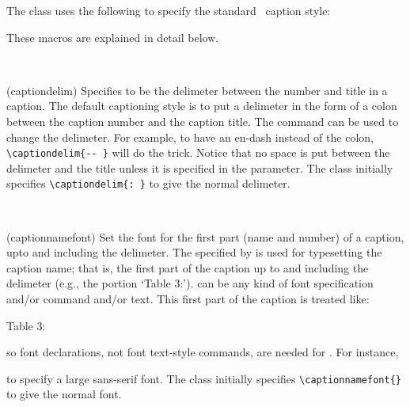     The class uses the following to specify the standard \ltx\ caption
style:
\begin{lcode}
\captionnamefont{}
\captiontitlefont{}
\captionstyle{}
\captionwidth{\linewidth}
\normalcaptionwidth
\normalcaption
\captiondelim{: }
\end{lcode}
These macros are explained in detail below.

\begin{syntax}
\cmd{\captiondelim} \\
\end{syntax}
\glossary(captiondelim)%
  {}%
  {Specifies  to be the delimeter between the number and title in a caption.}
 The default captioning style is to put a delimeter 
in the form of a colon between the caption
number and the caption title. The command \cmd{\captiondelim}
can be used to change the delimeter. For example, to have an en-dash instead
of the colon, \verb?\captiondelim{-- }? will do the trick. 
Notice that no space is put between the delimeter and the title unless 
it is specified in the  parameter. 
The class initially specifies \verb?\captiondelim{: }? to give the normal 
delimeter.



\begin{syntax}
\cmd{\captionnamefont} \\
\end{syntax}
\glossary(captionnamefont)%
  {}%
  {Set the font for the first part (name and number) of a caption, upto and including
   the delimeter.}
 The  specified by \cmd{\captionnamefont} is used
for typesetting the caption name; 
that is, the first part of the caption
up to and including the delimeter (e.g., the portion `Table 3:').
 can be any kind of font specification and/or command and/or 
text. This first part of the caption is treated like: 
\begin{lcode}
{\captionnamefont Table 3: }
\end{lcode}
so font declarations, not font text-style commands, are needed for 
. For instance, 
\begin{lcode}
\captionnamefont{\Large\sffamily}
\end{lcode} 
to specify a large sans-serif font. The class initially specifies 
\verb?\captionnamefont{}? to give the normal font.
 

